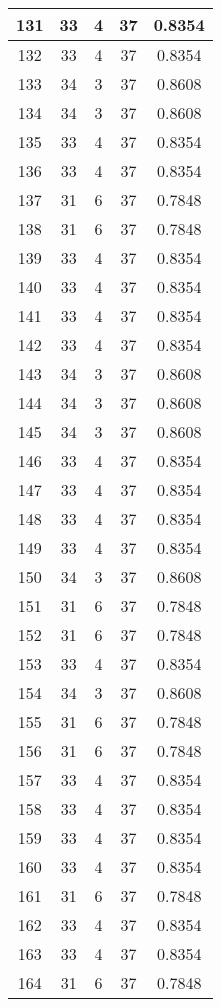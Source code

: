 \documentclass[letterpaper, 12pt]{article}
\begin{document}
\begin{longtable}{|c|c|c|c|c|}
\hline
131 & 33 & 4 & 37 & 0.8354 \\
\hline
132 & 33 & 4 & 37 & 0.8354 \\
\hline
133 & 34 & 3 & 37 & 0.8608 \\
\hline
134 & 34 & 3 & 37 & 0.8608 \\
\hline
135 & 33 & 4 & 37 & 0.8354 \\
\hline
136 & 33 & 4 & 37 & 0.8354 \\
\hline
137 & 31 & 6 & 37 & 0.7848 \\
\hline
138 & 31 & 6 & 37 & 0.7848 \\
\hline
139 & 33 & 4 & 37 & 0.8354 \\
\hline
140 & 33 & 4 & 37 & 0.8354 \\
\hline
141 & 33 & 4 & 37 & 0.8354 \\
\hline
142 & 33 & 4 & 37 & 0.8354 \\
\hline
143 & 34 & 3 & 37 & 0.8608 \\
\hline
144 & 34 & 3 & 37 & 0.8608 \\
\hline
145 & 34 & 3 & 37 & 0.8608 \\
\hline
146 & 33 & 4 & 37 & 0.8354 \\
\hline
147 & 33 & 4 & 37 & 0.8354 \\
\hline
148 & 33 & 4 & 37 & 0.8354 \\
\hline
149 & 33 & 4 & 37 & 0.8354 \\
\hline
150 & 34 & 3 & 37 & 0.8608 \\
\hline
151 & 31 & 6 & 37 & 0.7848 \\
\hline
152 & 31 & 6 & 37 & 0.7848 \\
\hline
153 & 33 & 4 & 37 & 0.8354 \\
\hline
154 & 34 & 3 & 37 & 0.8608 \\
\hline
155 & 31 & 6 & 37 & 0.7848 \\
\hline
156 & 31 & 6 & 37 & 0.7848 \\
\hline
157 & 33 & 4 & 37 & 0.8354 \\
\hline
158 & 33 & 4 & 37 & 0.8354 \\
\hline
159 & 33 & 4 & 37 & 0.8354 \\
\hline
160 & 33 & 4 & 37 & 0.8354 \\
\hline
161 & 31 & 6 & 37 & 0.7848 \\
\hline
162 & 33 & 4 & 37 & 0.8354 \\
\hline
163 & 33 & 4 & 37 & 0.8354 \\
\hline
164 & 31 & 6 & 37 & 0.7848 \\

\end{longtable}
\end{document}
